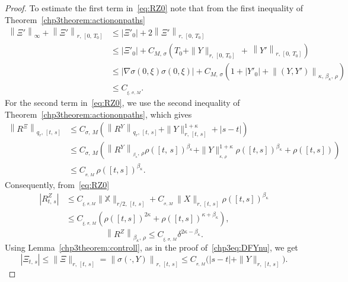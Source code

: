 \documentclass[AHL,Unicode,longabstracts,published]{cedram}
\newcommand{\bbX}{\mathbb{X}}
\begin{document}
\begin{proof}
To estimate the first term in~\eqref{eq:RZ0} note that from the first inequality of Theorem~\ref{chp3theorem:actiononpaths}
\begin{equation}\label{chp3eq:Xixiineq}
\begin{split}
\left\|\Xi'\right\|_{\infty}+\left\|\Xi'\right\|_{r,\,\left[0,\,T_0\right]}
&\leq \left|\Xi'_0\right|+2\left\|\Xi'\right\|_{r,\,\left[0,\,T_0\right]}\\
&\leq\left|\Xi'_0\right|+ C_{M,\,{\sigma}}\left(T_0+\|Y\|_{r,\,\left[0,\,T_0\right]}\, +\, \left\|Y'\right\|_{r,\,\left[0,\,T_0\right]}\right)\\
&\leq\left|\nabla \sigma (0, \xi)\sigma(0, \xi)\right|+ C_{M,\,{\sigma}}\left(1+\left|Y'_0\right|+\left\|\left(Y,Y'\right)\right\|_{\kappa,\,\beta_{\kappa},\,\rho}\right)\\
&\leq C_{_{\xi,\,\sigma,\,M}}.
\end{split}
\end{equation} 
For the second term in~\eqref{eq:RZ0}, we use the second inequality of Theorem~\ref{chp3theorem:actiononpaths}, which gives
\begin{equation}\label{chp3eq:Xixiineq2}
\begin{split}
\left\|R^{\Xi}\right\|_{q_r,\,[t,\,s]}
&\leq C_{\sigma,\,M}\left(
\left\|R^Y\right\|_{q_r,\,[t,\,s]}+ \|Y\|_{r, \,[t,\,s]}^{1+\kappa}+|s-t|\right)\\
&\leq C_{\sigma,\,M}\left(
\left\|R^Y\right\|_{_{\beta_{\kappa}},\,\rho}\rho([t,\,s])^{\beta_{\kappa}}+ \|Y\|_{_{\kappa, \,\rho}}^{1+\kappa} \rho([t,s])^{\beta_{\kappa}}+\rho([t,s])\right)\\
&\leq C_{_{\sigma,\,M}}\,\rho([t,s])^{\beta_{\kappa}}. 
\end{split}
\end{equation} 
Consequently, from~\eqref{eq:RZ0}
\begin{align*}
\left|R^Z_{t,\,s}\right|&\leq C_{_{\xi,\,\sigma, M}}\|\bbX\|_{r/2,\,[t,\,s]}+C_{_{\sigma,\,M}}\,\|X\|_{r,\,[t,\,s]}\rho([t,s])^{\beta_{\kappa}}\\
&\leq C_{_{\xi,\,\sigma,\,M}}\left(\rho([t,s])^{2\kappa} +\rho([t,s])^{\kappa+\beta_{\kappa}} \right),
\end{align*}
\begin{equation}\label{eq:RZbdd}
\left\|R^Z\right\|_{\beta_{\kappa},\,\rho}\leq C_{_{\xi,\,\sigma,\,M}}\delta^{2\kappa-\beta_{\kappa}}.
\end{equation}
Using Lemma~\ref{chp3theorem:controll}, as in the proof of~\eqref{chp3eq:DFYnu}, we get
\[
\left|\Xi_{t,\,s}\right|\leq \|\Xi\|_{r,\,[t,\,s]}=\left\|{\sigma}(\cdot, Y)\right\|_{r,\,[t,\,s]}\leq C_{_{\sigma,\,M}}\Big(|s-t|+ \|Y\|_{r,\,[t,\,s]}\Big).
\]
\end{proof}
\end{document}

